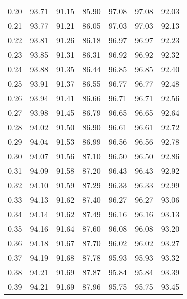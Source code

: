 \begin{tabular}{|c|c|c|c|c|c|c|}
      0.20 &     93.71 &     91.15 &      85.90 &   97.08 &      97.08 &         92.03 \\
      0.21 &     93.77 &     91.21 &      86.05 &   97.03 &      97.03 &         92.13 \\
      0.22 &     93.81 &     91.26 &      86.18 &   96.97 &      96.97 &         92.23 \\
      0.23 &     93.85 &     91.31 &      86.31 &   96.92 &      96.92 &         92.32 \\
      0.24 &     93.88 &     91.35 &      86.44 &   96.85 &      96.85 &         92.40 \\
      0.25 &     93.91 &     91.37 &      86.55 &   96.77 &      96.77 &         92.48 \\
      0.26 &     93.94 &     91.41 &      86.66 &   96.71 &      96.71 &         92.56 \\
      0.27 &     93.98 &     91.45 &      86.79 &   96.65 &      96.65 &         92.64 \\
      0.28 &     94.02 &     91.50 &      86.90 &   96.61 &      96.61 &         92.72 \\
      0.29 &     94.04 &     91.53 &      86.99 &   96.56 &      96.56 &         92.78 \\
      0.30 &     94.07 &     91.56 &      87.10 &   96.50 &      96.50 &         92.86 \\
      0.31 &     94.09 &     91.58 &      87.20 &   96.43 &      96.43 &         92.92 \\
      0.32 &     94.10 &     91.59 &      87.29 &   96.33 &      96.33 &         92.99 \\
      0.33 &     94.13 &     91.62 &      87.40 &   96.27 &      96.27 &         93.06 \\
      0.34 &     94.14 &     91.62 &      87.49 &   96.16 &      96.16 &         93.13 \\
      0.35 &     94.16 &     91.64 &      87.60 &   96.08 &      96.08 &         93.20 \\
      0.36 &     94.18 &     91.67 &      87.70 &   96.02 &      96.02 &         93.27 \\
      0.37 &     94.19 &     91.68 &      87.78 &   95.93 &      95.93 &         93.32 \\
      0.38 &     94.21 &     91.69 &      87.87 &   95.84 &      95.84 &         93.39 \\
      0.39 &     94.21 &     91.69 &      87.96 &   95.75 &      95.75 &         93.45 \\

\end{tabular}

